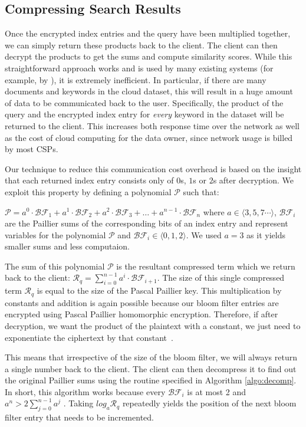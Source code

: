 \subsection{Compressing Search Results}

Once the encrypted index entries and the query have been multiplied together, 
we can simply return these products back to the client. The client can then decrypt the products to get the
sums and compute similarity scores. While this straightforward approach works and
is used by many existing systems (for example, by \cite{zeehan}), it is extremely
inefficient.
In particular, if there are many documents and keywords in the cloud dataset, this
will result in a huge amount of data to be communicated back to the user. Specifically,
the product of the query and the encrypted index entry for \textit{every} keyword in the dataset will be returned
to the client. This increases both response time over the network as well as
the cost of cloud computing for the data owner, since network usage is billed
by most CSPs.

Our technique to reduce this communication cost overhead is based on the insight that each returned
index entry consists only of $0$s, $1$s or $2$s after decryption. We exploit this
property by 
defining a polynomial $\mathcal{P}$ such that:

$
\mathcal{P} = {a}^0\cdot\mathcal{BF}_1 + {a}^1\cdot\mathcal{BF}_2 +
{a}^2\cdot\mathcal{BF}_3 + \ldots + {a}^{n-1}\cdot\mathcal{BF}_n
$
\newline
where ${a} \in \langle 3,5,7 \cdots \rangle $, $\mathcal{BF}_i$  are the
Paillier sums of the corresponding bits of an index entry and represent variables for
the polynomial $\mathcal{P}$ and $\mathcal{BF}_i \in \langle 0,1,2 \rangle $. We
used ${a}=3$ as it yields smaller sums and less computaion.


The sum of this polynomial $\mathcal{P}$ is the resultant compressed term which we return back
to the client:
$
\mathcal{R}_q = \sum_{i=0}^{n-1} {a}^{i}\cdot\mathcal{BF}_{i+1}
$.
The size of this single compressed term $\mathcal{R}_q$
is equal to the size of the Pascal Paillier key. 
This multiplication by constants and addition is again possible 
because our bloom filter entries are encrypted using Pascal Paillier homomorphic
encryption. Therefore, if after decryption, we want the product of the plaintext with a constant, we
just need to exponentiate the ciphertext by that constant~\cite{pascal}.

This means that irrespective of the size
of the bloom filter,
we will always return a single number back to the client. The client can then
decompress it to find out the original Paillier sums using the routine
specified in Algorithm \ref{algo:decomp}. In short, this algorithm works because every
$\mathcal{BF}_i$ is at most 2 and $ {a}^{n} > 2\sum_{j=0}^{n-1} {a}^{j}$ .
Taking $log_{a} \mathcal{R}_q$ repeatedly yields the position of the next
bloom filter entry that needs to be incremented.

